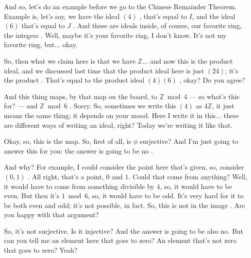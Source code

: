 \begin{speech}[00:02:30 - 00:04:48]
And so, let's do an example before we go to the Chinese Remainder Theorem. Example is, let's say, we have the ideal $(4)$ , that's equal to $I$, and the ideal $(6)$ that's equal to $J$ . And these are ideals inside, of course, our favorite ring, the integers . Well, maybe it's your favorite ring, I don't know. It's not my favorite ring, but... okay.

So, then what we claim here is that we have $\mathbb{Z}$... and now this is the product ideal, and we discussed last time that the product ideal here is just $(24)$; it's the product . That's equal to the product ideal $(4)(6)$ , okay? Do you agree?

And this thing maps, by that map on the board, to $\mathbb{Z} \bmod 4$ --- so what's this for? --- and $\mathbb{Z} \bmod 6$ . Sorry. So, sometimes we write this $(4)$ as $4\mathbb{Z}$, it just means the same thing; it depends on your mood. Here I write it in this... these are different ways of writing an ideal, right? Today we're writing it like that.

Okay, so, this is the map. So, first of all, is $\phi$ surjective?  And I'm just going to answer this for you: the answer is going to be no .

And why? For example, I could consider the point here that's given, so, consider $(0, 1)$ . All right, that's a point, $0$ and $1$. Could that come from anything? Well, it would have to come from something divisible by $4$, so, it would have to be even. But then it's $1 \bmod 6$, so, it would have to be odd. It's very hard for it to be both even and odd; it's not possible, in fact. So, this is not in the image . Are you happy with that argument?

So, it's not surjective. Is it injective?  And the answer is going to be also no. But can you tell me an element here that goes to zero? An element that's not zero that goes to zero? Yeah?
\end{speech}

